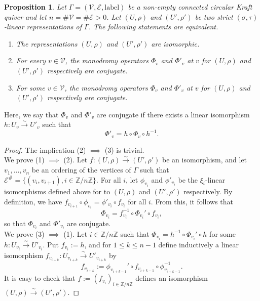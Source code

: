 \documentclass[12pt]{amsart}
\newtheorem{proposition}[theorem]{Proposition}
\theoremstyle{definition}
\newcommand{\<}{\langle}   %
\renewcommand{\>}{\rangle} %
\begin{document}
\begin{proposition}\label{Monodromy}
    Let $\Gamma = (\mathcal V,\mathcal E,\mathrm{label})$ be a non-empty connected circular Kraft quiver and let $n = \# \mathcal V = \# \mathcal E > 0$. Let $(U,\rho)$ and $(U',\rho')$ be two strict $(\sigma,\tau)$-linear representations of $\Gamma$. The following statements are equivalent.
    \begin{enumerate}
        \item The representations $(U,\rho)$ and $(U',\rho')$ are isomorphic.
        \item For every $v \in \mathcal V$, the monodromy operators $\Phi_v$ and $\Phi'_v$ at $v$ for $(U,\rho)$ and $(U',\rho')$ respectively are conjugate.
        \item For some $v \in \mathcal V$, the monodromy operators $\Phi_v$ and $\Phi'_v$ at $v$ for $(U,\rho)$ and $(U',\rho')$ respectively are conjugate.
    \end{enumerate}
\end{proposition}

Here, we say that $\Phi_v$ and $\Phi'_v$ are conjugate if there exists a linear isomorphism $h:U_v \xrightarrow{\sim} U'_v$ such that 
\begin{equation*}
    \Phi'_v = h \circ \Phi_v \circ h^{-1}.
\end{equation*}

\begin{proof}
    The implication (2) $\implies$ (3) is trivial.\\
    We prove (1) $\implies$ (2). Let $f:(U,\rho) \xrightarrow{\sim} (U',\rho')$ be an isomorphism, and let $v_1,\ldots , v_n$ be an ordering of the vertices of $\Gamma$ such that $\mathcal E^{\#} = \{(v_i,v_{i+1}),i\in\mathbb Z/n\mathbb Z\}$. For all $i$, let $\phi_{v_i}$ and $\phi'_{v_i}$ be the $\xi_i$-linear isomorphisms defined above for to $(U,\rho)$ and $(U',\rho')$ respectively. By definition, we have $f_{v_{i+1}}\circ \phi_{v_i} = \phi'_{v_{i}} \circ f_{v_i}$ for all $i$. From this, it follows that
    \begin{equation*}
        \Phi_{v_i} = f_{v_i}^{-1} \circ \Phi_{v_i}' \circ f_{v_i},
    \end{equation*}
    so that $\Phi_{v_i}$ and $\Phi'_{v_i}$ are conjugate.\\
    We prove (3) $\implies$ (1). Let $i \in \mathbb Z/n\mathbb Z$ such that $\Phi_{v_i} = h^{-1} \circ \Phi_{v_i}' \circ h$ for some $h: U_{v_i} \xrightarrow{\sim} U'_{v_i}$. Put $f_{v_i} := h$, and for $1 \leq k \leq n-1$ define inductively a linear isomorphism $f_{v_{i+k}}:U_{v_{i+k}} \xrightarrow{\sim} U'_{v_{i+k}}$ by
    \begin{equation*}
        f_{v_{i+k}} := \phi_{v_{i+k-1}}' \circ f_{v_{i+k-1}} \circ \phi_{v_{i+k-1}}^{-1}.
    \end{equation*}
    It is easy to check that $f := (f_{v_i})_{i \in \mathbb Z/n\mathbb Z}$ defines an isomorphism $(U,\rho) \xrightarrow{\sim} (U',\rho')$.
\end{proof}
\end{document}

